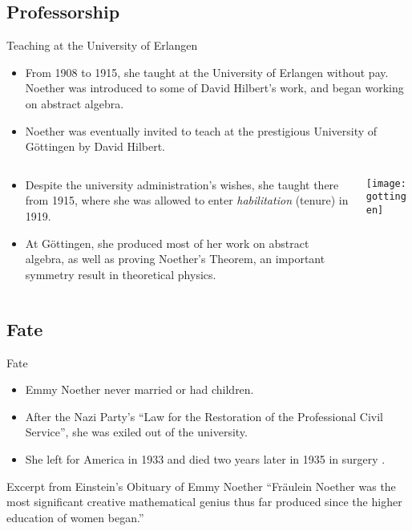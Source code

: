 \documentclass[10pt]{beamer}
\begin{document}
\subsection{Professorship}
\begin{frame}{Teaching at the University of Erlangen}
\begin{itemize}
\item From 1908 to 1915, she taught at the University of Erlangen without pay. Noether was introduced to some of David Hilbert's work, and began working on abstract algebra.

\item Noether was eventually invited to teach at the prestigious University of G\"ottingen by David Hilbert.
\end{itemize}
\begin{columns}
\begin{column}{0.5\textwidth}
\begin{itemize}
\item Despite the university administration's wishes, she taught there from 1915,
where she was allowed to enter \textit{habilitation} (tenure) in 1919.

\item At G\"ottingen, she produced most of her work on abstract algebra, as
well as proving Noether's Theorem, an important symmetry result in theoretical
physics.
\end{itemize}
\end{column}
\begin{column}{0.5\textwidth}
\texttt{[image: gottingen]}
\end{column}
\end{columns}
\end{frame}

\subsection{Fate}
\begin{frame}{Fate}
\begin{itemize}
\item Emmy Noether never married or had children.

\item After the Nazi Party's ``Law for the Restoration of the
Professional Civil Service'', she was exiled out of the university.

\item She left for America in 1933 and died two years later in 1935 in surgery
\cite{biography}.
\end{itemize}

\begin{block}{Excerpt from Einstein's Obituary of Emmy Noether}
``Fr\"aulein Noether was the most significant creative mathematical genius thus far produced since the higher education of women began.'' \cite{einstein}
\end{block}
\end{frame}
\end{document}
